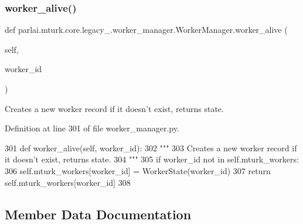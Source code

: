 \subsubsection{\texorpdfstring{worker\+\_\+alive()}{worker\_alive()}}
{\footnotesize\ttfamily def parlai.\+mturk.\+core.\+legacy\+\_.\+worker\+\_\+manager.\+Worker\+Manager.\+worker\+\_\+alive (\begin{DoxyParamCaption}\item[{}]{self,  }\item[{}]{worker\+\_\+id }\end{DoxyParamCaption})}

\begin{DoxyVerb}Creates a new worker record if it doesn't exist, returns state.
\end{DoxyVerb}
 

Definition at line 301 of file worker\+\_\+manager.\+py.


\begin{DoxyCode}
301     \textcolor{keyword}{def }worker\_alive(self, worker\_id):
302         \textcolor{stringliteral}{"""}
303 \textcolor{stringliteral}{        Creates a new worker record if it doesn't exist, returns state.}
304 \textcolor{stringliteral}{        """}
305         \textcolor{keywordflow}{if} worker\_id \textcolor{keywordflow}{not} \textcolor{keywordflow}{in} self.mturk\_workers:
306             self.mturk\_workers[worker\_id] = WorkerState(worker\_id)
307         \textcolor{keywordflow}{return} self.mturk\_workers[worker\_id]
308 
\end{DoxyCode}


\subsection{Member Data Documentation}
\mbox{\label{classparlai_1_1mturk_1_1core_1_1legacy__2018_1_1worker__manager_1_1WorkerManager_aed0adcac2d4346a8547c3a536fd0af25}} 
